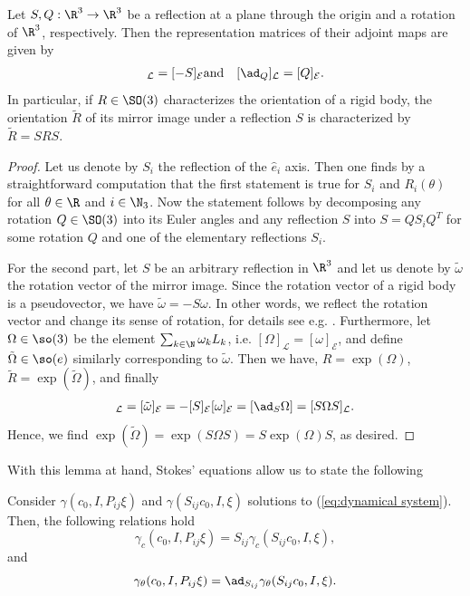 \begin{lemma}
\label{lem:mirror image of orientation}
Let $S, Q:\R^3 \to \R^3$ be a reflection at a plane through the origin and a rotation of $\R^3$, respectively. Then the representation matrices of their adjoint maps are given by
\begin{eqnarray}
[\ad_{S}]_{\mathcal{L}} = [-S]_{\mathcal{E}} & \text{and}  & [\ad_{Q}]_{\mathcal{L}} = [Q]_{\mathcal{E}}.
\end{eqnarray}
In particular, if $R \in \SO(3)$ characterizes the orientation of a rigid body, the orientation $\tilde{R}$ of its mirror image under a reflection $S$ is characterized by $\tilde{R} = SRS$.
\end{lemma}

\begin{proof}
Let us denote by $S_i$ the reflection of the $\hat{e}_i$ axis. Then one finds by a straightforward computation that the first statement is true for $S_i$ and $R_i(\theta)$ for all $\theta \in \R$ and $i \in \N_3$. Now the statement follows by decomposing any rotation $Q \in \SO(3)$ into its Euler angles and any reflection $S$ into $S = Q S_i Q^{T}$ for some rotation $Q$ and one of the elementary reflections $S_i$.

For the second part, let $S$ be an arbitrary reflection in $\R^3$ and let us denote by $\tilde{\omega}$ the rotation vector of the mirror image. Since the rotation vector of a rigid body is a pseudovector, we have $\tilde{\omega} = -S\omega$. In other words, we reflect the rotation vector and change its sense of rotation, for details see e.g. \cite{ChrisDoran2015}. Furthermore, let $\Omega \in \so(3)$ be the element $\sum_{k \in \N} \omega_k L_k$, i.e. $[\Omega]_{\mathcal{L}} = [\omega]_{\mathcal{E}}$, and define $\tilde{\Omega} \in \so(e)$ similarly corresponding to $\tilde{\omega}$. Then we have, $R = \exp(\Omega)$, $\tilde{R} = \exp(\tilde{\Omega})$, and finally
\begin{align}
   [\tilde{\Omega}]_{\mathcal{L}} = [\tilde{\omega}]_{\mathcal{E}} = -[S]_{\mathcal{E}} [\omega]_{\mathcal{E}} = [\ad_{S} \Omega] = [S \Omega S]_{\mathcal{L}}. 
\end{align}
Hence, we find $\exp(\tilde{\Omega}) = \exp( S \Omega S) = S \exp(\Omega) S$, as desired.
\end{proof}

With this lemma at hand, Stokes' equations allow us to state the following

\begin{condition}
\label{cond:swap}
Consider $\gamma(c_0, I, P_{ij} \xi)$ and $\gamma(S_{ij}c_0, I, \xi)$ solutions to (\ref{eq:dynamical system}). Then, the following relations hold
\begin{equation}
	\gamma_c(c_0, I, P_{ij} \xi) = S_{ij} \gamma_c(S_{ij}c_0, I, \xi),
\end{equation}
and
\begin{equation}
	\gamma_{\theta}(c_0, I, P_{ij} \xi ) = \ad_{S_{ij}} \gamma_{\theta} (S_{ij} c_0, I, \xi).
\end{equation}
\end{condition}

